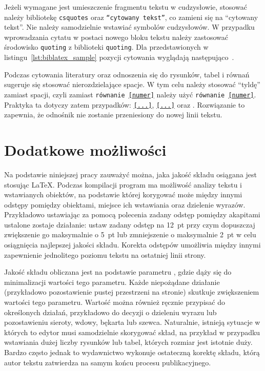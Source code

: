 Jeżeli wymagane jest umieszczenie fragmentu tekstu w cudzysłowie, stosować należy bibliotekę \texttt{csquotes} oraz \texttt{\enquote{cytowany tekst}}, co zamieni się na \enquote{cytowany tekst}. Nie należy samodzielnie wstawiać symbolów cudzysłowów. W przypadku wprowadzania cytatu w postaci nowego bloku tekstu należy zastosować środowisko \texttt{quoting} z biblioteki \texttt{quoting}. Dla przedstawionych w listingu~\ref{lst:biblatex_sample} pozycji cytowania wyglądają następująco~\cite{ldrjro_dwtownerr, mallat_wavelet}.

Podczas cytowania literatury oraz odnoszenia się do rysunków, tabel i równań sugeruje się stosować nierozdzielające spacje. W tym celu należy stosować \enquote{tyldę} zamiast spacji, czyli zamiast \texttt{równanie \eqref{numer}} należy użyć \texttt{równanie~\eqref{numer}}. Praktyka ta dotyczy zatem przypadków: \texttt{\eqref{...}}, \texttt{\ref{...}} oraz \texttt{\cite{...}}. Rozwiązanie to zapewnia, że odnośnik nie zostanie przeniesiony do nowej linii tekstu.

\section{Dodatkowe możliwości}

Na podstawie niniejszej pracy zauważyć można, jaka jakość składu osiągana jest stosując \LaTeX{}. Podczas kompilacji program ma możliwość analizy tekstu i wstawianych obiektów, na podstawie której korygować może między innymi odstępy pomiędzy obiektami, miejsce ich wstawiania oraz dzielenie wyrazów. Przykładowo ustawiając za pomocą polecenia\texttt{\setlength{\parskip}{12pt plus 5pt minus 2pt}} zadany odstęp pomiędzy akapitami ustalone zostaje działanie: ustaw zadany odstęp na \qty{12}{pt} przy czym dopuszczaj zwiększenie go maksymalnie o \qty{5}{pt} lub zmniejszenie o maksymalnie \qty{2}{pt} w celu osiągnięcia najlepszej jakości składu. Korekta odstępów umożliwia między innymi zapewnienie jednolitego poziomu tekstu na ostatniej linii strony.

Jakość składu obliczana jest na podstawie parametru \texttt{\badness}, gdzie dąży się do minimalizacji wartości tego parametru. Każde niepożądane działanie (przykładowo pozostawienie pustej przestrzeni na stronie) skutkuje zwiększeniem wartości tego parametru. Wartość \texttt{\badness} można również ręcznie przypisać do określonych działań, przykładowo do decyzji o dzieleniu wyrazu lub pozostawieniu sieroty, wdowy, bękarta lub szewca. Naturalnie, istnieją sytuacje w których to edytor musi samodzielnie skorygować skład, na przykład w przypadku wstawiania dużej liczby rysunków lub tabel, których rozmiar jest istotnie duży. Bardzo często jednak to wydawnictwo wykonuje ostateczną korektę składu, którą autor tekstu zatwierdza na samym końcu procesu publikacyjnego.

